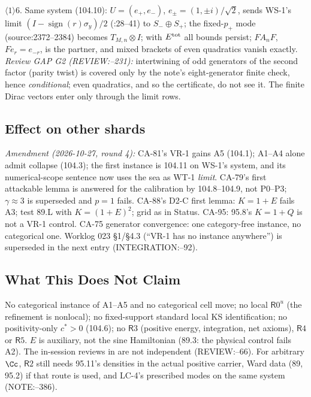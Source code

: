 \par\(\langle1\rangle6\). Same system (104.10): \(U=(e_+,e_-)\), \(e_\pm=(1,\pm i)/\sqrt2\), sends WS-1's limit \((I-\operatorname{sign}(r)\sigma_y)/2\)
(:28--41) to \(S_-\oplus S_+\); the fixed-\(p_+\) mode (source:2372--2384) becomes \(T_{M,n}\otimes I\); with
\(E^{\rm tot}\) all bounds persist; \(FA_nF\), \(Fe_r=e_{-r}\), is the partner, and mixed brackets of even quadratics vanish exactly.
\emph{Review GAP G2 (REVIEW:--231):} intertwining of odd generators of the second factor (parity twist) is
covered only by the note's eight-generator finite check, hence \emph{conditional}; even quadratics, and so the
certificate, do not see it. The finite Dirac vectors enter only through the limit rows.

\subsection{Effect on other shards}

\emph{Amendment (2026-10-27, round 4):} CA-81's VR-1 gains A5 (104.1); A1--A4 alone admit collapse (104.3); the first
instance is 104.11 on WS-1's system, and its numerical-scope sentence now uses the sea as WT-1 \emph{limit}.
CA-79's first attackable lemma is answered for the calibration by 104.8--104.9, not P0--P3; \(\gamma\approx3\) is superseded
and \(p=1\) fails. CA-88's D2-C first lemma: \(K=1+E\) fails A3; test 89.L with \(K=(1+E)^2\); grid as in Status.
CA-95: 95.8's \(K=1+Q\) is not a VR-1 control. CA-75 generator convergence: one category-free instance, no categorical one.
Worklog 023 \S1/\S4.3 (``VR-1 has no instance anywhere'') is superseded in the next entry (INTEGRATION:--92).

\subsection{What This Does Not Claim}

No categorical instance of A1--A5 and no categorical cell move; no local \(\mathsf R0^u\) (the refinement is nonlocal);
no fixed-support standard local KS identification; no positivity-only \(c^*>0\) (104.6); no \(\mathsf R3\)
(positive energy, integration, net axioms), \(\mathsf R4\) or \(\mathsf R5\). \(E\) is auxiliary, not the sine Hamiltonian
(89.3: the physical control fails A2). The in-session reviews in  are not independent (REVIEW:--66).
For arbitrary \(\Cc\), \(\mathsf R2\) still needs 95.11's densities in the actual positive carrier, Ward data (89, 95.2) if
that route is used, and LC-4's prescribed modes on the same system (NOTE:--386).

